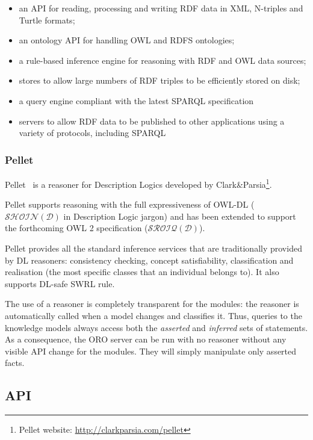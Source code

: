 \begin{itemize}
    \item an API for reading, processing and writing RDF data in XML, N-triples
    and Turtle formats;
    \item an ontology API for handling OWL and RDFS ontologies;
    \item a rule-based inference engine for reasoning with RDF and OWL data
    sources;
    \item stores to allow large numbers of RDF triples to be efficiently stored
    on disk;
    \item a query engine compliant with the latest SPARQL specification
    \item servers to allow RDF data to be published to other applications using
    a variety of protocols, including SPARQL
\end{itemize}

\subsubsection{Pellet}
\label{sect|pellet}

{\sc Pellet}~\cite{Sirin2007} is a reasoner for Description Logics developed by
Clark\&Parsia\footnote{{\sc Pellet} website:
\url{http://clarkparsia.com/pellet}}.

Pellet supports reasoning with the full expressiveness of OWL-DL
($\mathcal{SHOIN(D)}$ in Description Logic jargon) and has been extended to
support the forthcoming OWL 2 specification ($\mathcal{SROIQ(D)}$).

Pellet provides all the standard inference services that are traditionally
provided by DL reasoners: consistency checking, concept satisfiability,
classification and realisation (the most specific classes that an individual
belongs to). It also supports DL-safe SWRL rule.


The use of a reasoner is completely transparent for the modules: the reasoner
is automatically called when a model changes and classifies it. Thus, queries
to the knowledge models always access both the \emph{asserted} and
\emph{inferred} sets of statements. As a consequence, the ORO server can be run
with no reasoner without any visible API change for the modules. They will
simply manipulate only asserted facts.

\subsection{API}

